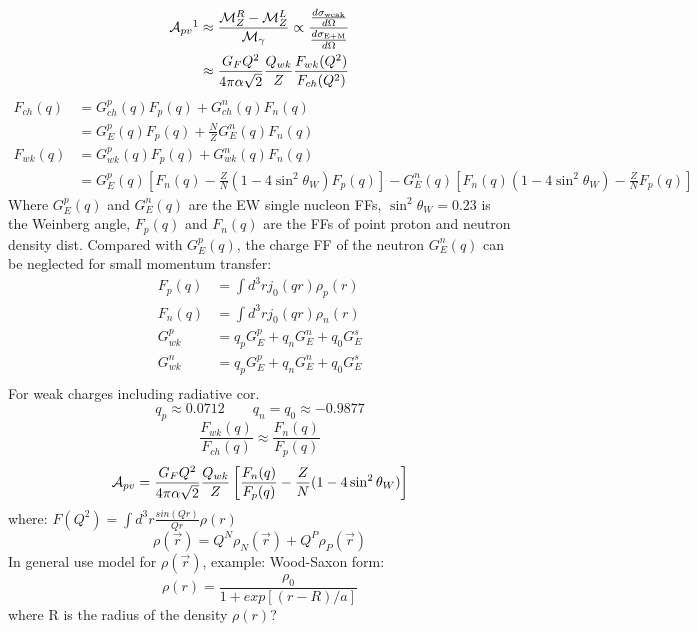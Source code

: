 \begin{equation*}
    \begin{aligned}
	\CA_{pv}\footnotemark &\approx \frac{\CM_Z^R - \CM_Z^L}{\CM_\gamma} \propto \frac{\frac{d\sigma_{\text{weak}}}{d\Omega}}{\frac{d\sigma_{\text{E+M}}}{d\Omega}}	\\
	    &\approx \frac{G_F Q^2}{4\pi\alpha\sqrt{2}} \frac{Q_{wk}}{Z}\frac{F_{wk}(Q^2)}{F_{ch}(Q^2)}
    \end{aligned}
\end{equation*}
\begin{equation*}
    \begin{aligned}
	F_{ch}(q) &= G_{ch}^p(q)F_p(q) + G_{ch}^n(q)F_n(q)  \\
		  &= G_E^p(q)F_p(q) + \frac{N}{Z}G_E^n(q)F_n(q)	\\
	F_{wk}(q) &= G_{wk}^p(q)F_p(q) + G_{wk}^n(q)F_n(q)  \\
		  &= G_E^p(q)\left[ F_n(q) - \frac{Z}{N}(1-4\sin^2\theta_W)F_p(q)\right] - G_E^n(q)\left[ F_n(q)(1-4\sin^2\theta_W) - \frac{Z}{N}F_p(q)\right]
    \end{aligned}
\end{equation*}
Where $G_E^p(q)$ and $G_E^n(q)$ are the EW single nucleon FFs, $\sin^2\theta_W = 0.23$ is the Weinberg angle, $F_p(q)$ and $F_n(q)$ are the FFs of point proton and neutron density dist. Compared with $G_E^p(q)$, the charge FF of the neutron $G_E^n(q)$ can be neglected for small momentum transfer:
\begin{equation*}
    \begin{aligned}
	F_p(q) &= \int d^3r j_0(qr) \rho_p(r)	\\
	F_n(q) &= \int d^3r j_0(qr) \rho_n(r)	\\
	G_{wk}^p &= q_p G_E^p + q_n G_E^n + q_0 G_E^s	\\
	G_{wk}^n &= q_p G_E^p + q_n G_E^n + q_0 G_E^s	\\
    \end{aligned}
\end{equation*}
For weak charges including radiative cor.
$$ q_p \approx 0.0712	\qquad q_n = q_0 \approx -0.9877 $$
$$ \frac{F_{wk}(q)}{F_{ch}(q)} \approx \frac{F_n(q)}{F_p(q)}$$
$$ \mathcal{A}_{pv} = \frac{G_FQ^2}{4\pi\alpha\sqrt{2}}\frac{Q_{wk}}{Z}\left[ \frac{F_n(q)}{F_p(q)} - \frac{Z}{N}(1-4\sin^2\theta_W) \right]$$
where: $F(Q^2) = \int d^3r \frac{sin(Qr)}{Qr}\rho(r)$
\begin{equation*}
    \rho(\vec{r}) = Q^{N}\rho_N(\vec{r}) + Q^{P}\rho_P(\vec{r})
\end{equation*}
In general use model for $\rho(\vec{r})$, example: Wood-Saxon form:
\begin{equation*}
    \rho(r) = \frac{\rho_0}{1 + exp[(r-R)/a]}
\end{equation*}
where R is the radius of the density $\rho(r)$?

